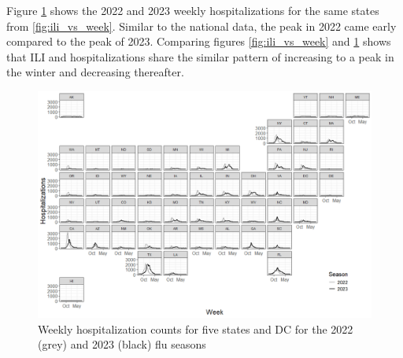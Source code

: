 \documentclass[ba]{imsart}
\theoremstyle{plain}
\theoremstyle{definition}
\theoremstyle{remark}
\begin{document}
\begin{supplement}
Figure \ref{fig:hosp_vs_week} shows the 2022 and 2023 weekly hospitalizations for the same states from \ref{fig:ili_vs_week}. Similar to the national data, the peak in 2022 came early compared to the peak of 2023. Comparing figures \ref{fig:ili_vs_week} and \ref{fig:hosp_vs_week} shows that ILI and hospitalizations share the similar pattern of increasing to a peak in the winter and decreasing thereafter. 

\begin{figure}[hbt!]
    \centering
    \includegraphics[scale=.55]{Images/hosp_vs_week.png}
    \caption{Weekly hospitalization counts for five states and DC for the 2022 (grey) and 2023 (black) flu seasons}
    \label{fig:hosp_vs_week}
\end{figure}





% 







\end{supplement}
\end{document}
